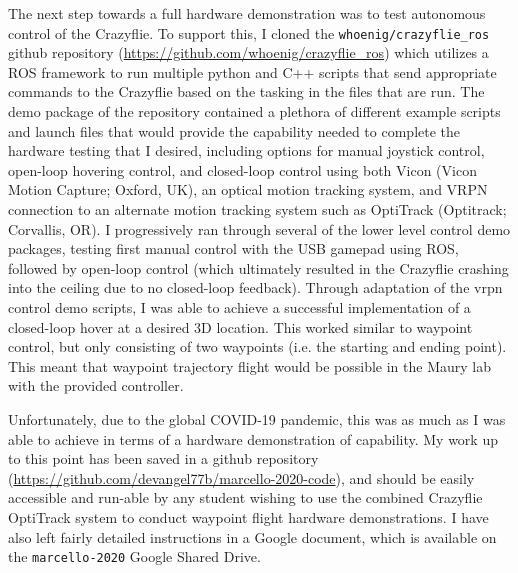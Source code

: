 The next step towards a full hardware demonstration was to test autonomous control of the Crazyflie. To support this, I cloned the \lstinline{whoenig/crazyflie_ros} github repository (\url{https://github.com/whoenig/crazyflie_ros}) which utilizes a ROS framework to run multiple python and C++ scripts that send appropriate commands to the Crazyflie based on the tasking in the files that are run. The demo package of the repository contained a plethora of different example scripts and launch files that would provide the capability needed to complete the hardware testing that I desired, including options for manual joystick control, open-loop hovering control, and closed-loop control using both Vicon (Vicon Motion Capture; Oxford, UK), an optical motion tracking system, and VRPN connection to an alternate motion tracking system such as OptiTrack (Optitrack; Corvallis, OR). I progressively ran through several of the lower level control demo packages, testing first manual control with the USB gamepad using ROS, followed by open-loop control (which ultimately resulted in the Crazyflie crashing into the ceiling due to no closed-loop feedback). Through adaptation of the vrpn control demo scripts, I was able to achieve a successful implementation of a closed-loop hover at a desired 3D location. This worked similar to waypoint control, but only consisting of two waypoints (i.e. the starting and ending point). This meant that waypoint trajectory flight would be possible in the Maury lab with the provided controller. 

Unfortunately, due to the global COVID-19 pandemic, this was as much as I was able to achieve in terms of a hardware demonstration of capability. My work up to this point has been saved in a github repository (\url{https://github.com/devangel77b/marcello-2020-code}), and should be easily accessible and run-able by any student wishing to use the combined Crazyflie OptiTrack system to conduct waypoint flight hardware demonstrations. I have also left fairly detailed instructions in a Google document, which is available on the \lstinline{marcello-2020} Google Shared Drive.
